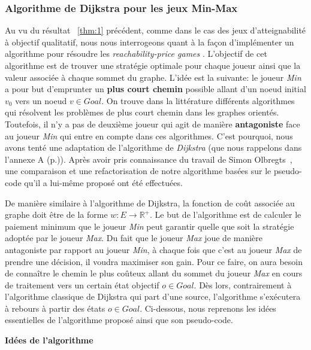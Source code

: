 \subsubsection{Algorithme de Dijkstra pour les jeux Min-Max}




Au vu du résultat ~\ref{thm:1} précédent, comme dans le cas des jeux d'atteignabilité à objectif qualitatif, nous nous interrogeons quant à la façon d'implémenter un algorithme pour résoudre les \og \textit{reachability-price games} \fg. L'objectif de cet algorithme est de trouver une stratégie optimale pour chaque joueur ainsi que la valeur associée à chaque sommet du graphe. L'idée est la suivante: le joueur \textit{Min} a pour but d'emprunter un \textbf{plus court chemin} possible allant d'un noeud initial $v_{0}$ vers un noeud $v \in Goal$. On trouve dans la littérature différents algorithmes qui résolvent les problèmes de plus court chemin dans les graphes orientés. Toutefois, il n'y a pas de deuxième joueur qui agit de manière \textbf{antagoniste} face au joueur \textit{Min} qui entre en compte dans ces algorithmes. C'est pourquoi, nous avons tenté une adaptation de l'algorithme de \textit{Dijkstra} (que nous rappelons dans l'annexe A (p.\pageref{algo:dijkstra})). Après avoir pris connaissance du travail de Simon Olbregts~\cite{simon}, une comparaison et une refactorisation de notre algorithme basées sur le pseudo-code qu'il a lui-même proposé ont été effectuées.

De manière similaire à l'algorithme de Dijkstra, la fonction de coût associée au graphe doit être de la forme $w : E \rightarrow \mathbb{R}^{+}$. Le but de l'algorithme est de calculer le paiement minimum que le joueur \textit{Min} peut garantir quelle que soit la stratégie adoptée par le joueur \textit{Max}. Du fait que le joueur \textit{Max} joue de manière antagoniste par rapport au joueur \textit{Min}, à chaque fois que c'est au joueur \textit{Max} de prendre une décision, il voudra maximiser son gain. Pour ce faire, on aura besoin de connaître le chemin le plus coûteux allant du sommet du joueur \textit{Max} en cours de traitement vers un certain état objectif $o \in Goal$. Dès lors, contrairement à l'algorithme classique de Dijkstra qui part d'une source, l'algorithme s'exécutera à rebours à partir des états $o \in Goal$. Ci-dessous, nous reprenons les idées essentielles de l'algorithme proposé ainsi que son pseudo-code.\\
\newpage

\noindent \textbf{Idées de l'algorithme}\\

